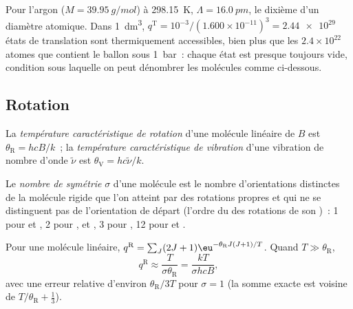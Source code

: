 \begin{example}\label{ex:b3:partition-functions:argon}
Pour l'argon ($M = \qty{39.95}{g/mol}$) à \qty{298.15}{K},
$\Lambda = \qty{16.0}{pm}$, le dixième d'un diamètre atomique. Dans
\qty{1}{dm^3}, $q^{\mathrm T} = 10^{-3}/(1.600\times10^{-11})^3 = \num{2.44e29}$
états de translation sont thermiquement accessibles, bien plus que les
$2.4\times10^{22}$ atomes que contient le ballon sous \qty{1}{bar}~:
chaque état est presque toujours vide, condition sous laquelle on peut
dénombrer les molécules comme ci-dessous.
\end{example}

\subsection*{Rotation}

\begin{definition}\label{def:b3:partition-functions:characteristic-temperature}
La \emph{température caractéristique de rotation}
d'une molécule linéaire de  $B$ est $\theta_{\mathrm R} =
hcB/k$~; la \emph{température caractéristique de vibration}
d'une vibration de nombre d'onde $\tilde\nu$ est $\theta_{\mathrm V} =
hc\tilde\nu/k$.
\end{definition}

\begin{definition}\label{def:b3:partition-functions:symmetry-number}
Le \emph{nombre de symétrie} $\sigma$ d'une molécule est le
nombre d'orientations distinctes de la molécule rigide que l'on atteint
par des rotations propres et qui ne se distinguent pas de l'orientation
de départ (l'ordre du  des rotations de son )~: 1 pour  et , 2 pour ,
 et , 3 pour , 12 pour  et .
\end{definition}

\begin{proposition}\label{prop:b3:partition-functions:q-rot}
Pour une molécule linéaire, $q^{\mathrm R} = \sum_J(2J+1)\eu^{-\theta_{\mathrm R}J(J+1)/T}$. Quand $T \gg
\theta_{\mathrm R}$,
\[
  q^{\mathrm R} \approx \frac{T}{\sigma\theta_{\mathrm R}} = \frac{kT}{\sigma hcB},
\]
avec une erreur relative d'environ $\theta_{\mathrm R}/3T$ pour
$\sigma = 1$ (la somme exacte est voisine
de $T/\theta_{\mathrm R} + \frac13$).
\end{proposition}

